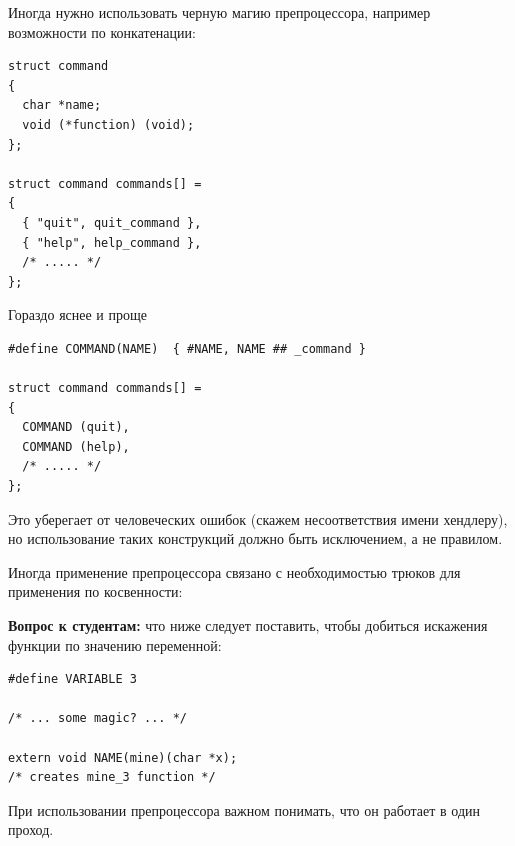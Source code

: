 \documentclass[a4paper,12pt,oneside]{article}
\newif\ifanswers
\begin{document}
Иногда нужно использовать черную магию препроцессора, например возможности по конкатенации:

\begin{lstlisting}
struct command
{
  char *name;
  void (*function) (void);
};
     
struct command commands[] =
{
  { "quit", quit_command },
  { "help", help_command },
  /* ..... */
};
\end{lstlisting}

Гораздо яснее и проще

\begin{lstlisting}
#define COMMAND(NAME)  { #NAME, NAME ## _command }
     
struct command commands[] =
{
  COMMAND (quit),
  COMMAND (help),
  /* ..... */
};
\end{lstlisting}

Это уберегает от человеческих ошибок (скажем несоответствия имени хендлеру), но использование таких конструкций должно быть исключением, а не правилом.

Иногда применение препроцессора связано с необходимостью трюков для применения по косвенности:

\textbf{Вопрос к студентам:} что ниже следует поставить, чтобы добиться искажения функции по значению переменной:

\begin{lstlisting}
#define VARIABLE 3

/* ... some magic? ... */

extern void NAME(mine)(char *x);
/* creates mine_3 function */
\end{lstlisting}

\ifanswers
Правильный ответ должен включать не менее трёх уровней косвенности:

\begin{lstlisting}
#define PASTER(x,y) x ## _ ## y
#define EVALUATOR(x,y)  PASTER(x,y)
#define NAME(fun) EVALUATOR(fun, VARIABLE)
\end{lstlisting}

Порядок расширения макросов следующий:

\begin{lstlisting}
NAME(mine)
EVALUATOR(mine, VARIABLE)
PASTER(mine, 3)
\end{lstlisting}

Поэтому пропустить хотя бы один уровень косвенности здесь нельзя.
\fi

При использовании препроцессора важном понимать, что он работает в один проход.
\end{document}
